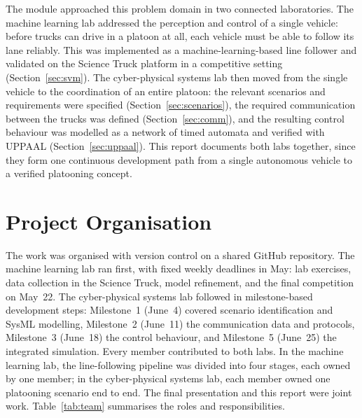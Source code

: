\documentclass[english]{lni}
\begin{document}
The module approached this problem domain in two connected laboratories. The machine learning lab addressed the perception and control of a single vehicle: before trucks can drive in a platoon at all, each vehicle must be able to follow its lane reliably. This was implemented as a machine-learning-based line follower and validated on the Science Truck platform in a competitive setting (Section~\ref{sec:svm}). The cyber-physical systems lab then moved from the single vehicle to the coordination of an entire platoon: the relevant scenarios and requirements were specified (Section~\ref{sec:scenarios}), the required communication between the trucks was defined (Section~\ref{sec:comm}), and the resulting control behaviour was modelled as a network of timed automata and verified with UPPAAL (Section~\ref{sec:uppaal}). This report documents both labs together, since they form one continuous development path from a single autonomous vehicle to a verified platooning concept.

\section{Project Organisation}\label{sec:org}
The work was organised with version control on a shared GitHub repository. The machine learning lab ran first, with fixed weekly deadlines in May: lab exercises, data collection in the Science Truck, model refinement, and the final competition on May~22. The cyber-physical systems lab followed in milestone-based development steps: Milestone~1 (June~4) covered scenario identification and SysML modelling, Milestone~2 (June~11) the communication data and protocols, Milestone~3 (June~18) the control behaviour, and Milestone~5 (June~25) the integrated simulation. Every member contributed to both labs. In the machine learning lab, the line-following pipeline was divided into four stages, each owned by one member; in the cyber-physical systems lab, each member owned one platooning scenario end to end. The final presentation and this report were joint work. Table~\ref{tab:team} summarises the roles and responsibilities.
\end{document}
